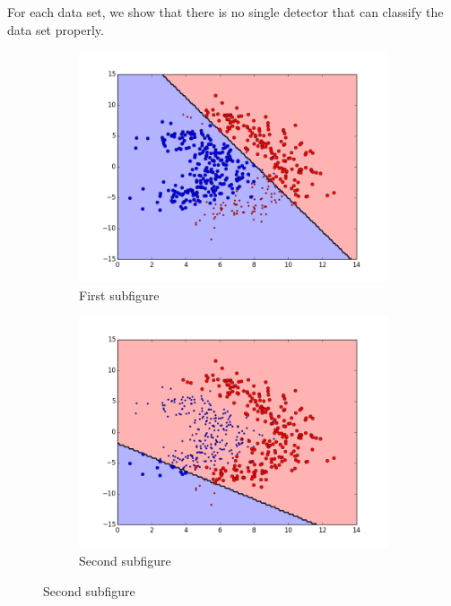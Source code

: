 For each data set, we show that there is no single detector that can classify the data set properly. 

\begin{figure}[t!] %
\begin{subfigure}{0.48\textwidth}
\includegraphics[width=\linewidth]{figs/Lithuanian/20All-Classifiers}
\caption{First subfigure} \label{fig:Lithuanian_all_single_a}
\end{subfigure}\hspace*{\fill}
\begin{subfigure}{0.48\textwidth}
\includegraphics[width=\linewidth]{figs/Lithuanian/43All-Classifiers}
\caption{Second subfigure} \label{fig:Lithuanian_all_single_b}
\end{subfigure}


\end{figure}
